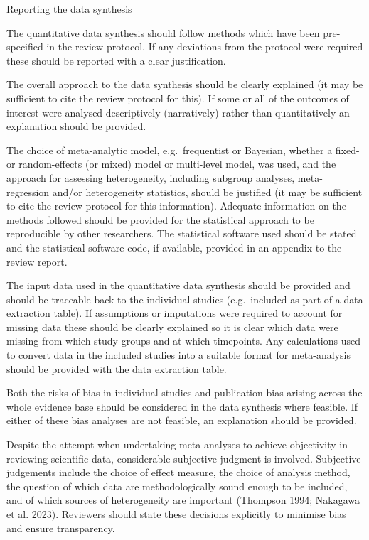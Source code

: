 \documentclass[
  letterpaper,
  DIV=11,
  numbers=noendperiod]{scrreprt}
\begin{document}
Reporting the data synthesis

The quantitative data synthesis should follow methods which have been
pre-specified in the review protocol. If any deviations from the
protocol were required these should be reported with a clear
justification.

The overall approach to the data synthesis should be clearly explained
(it may be sufficient to cite the review protocol for this). If some or
all of the outcomes of interest were analysed descriptively
(narratively) rather than quantitatively an explanation should be
provided.

The choice of meta-analytic model, e.g.~frequentist or Bayesian, whether
a fixed- or random-effects (or mixed) model or multi-level model, was
used, and the approach for assessing heterogeneity, including subgroup
analyses, meta-regression and/or heterogeneity statistics, should be
justified (it may be sufficient to cite the review protocol for this
information). Adequate information on the methods followed should be
provided for the statistical approach to be reproducible by other
researchers. The statistical software used should be stated and the
statistical software code, if available, provided in an appendix to the
review report.

The input data used in the quantitative data synthesis should be
provided and should be traceable back to the individual studies
(e.g.~included as part of a data extraction table). If assumptions or
imputations were required to account for missing data these should be
clearly explained so it is clear which data were missing from which
study groups and at which timepoints. Any calculations used to convert
data in the included studies into a suitable format for meta-analysis
should be provided with the data extraction table.

Both the risks of bias in individual studies and publication bias
arising across the whole evidence base should be considered in the data
synthesis where feasible. If either of these bias analyses are not
feasible, an explanation should be provided.

Despite the attempt when undertaking meta-analyses to achieve
objectivity in reviewing scientific data, considerable subjective
judgment is involved. Subjective judgements include the choice of effect
measure, the choice of analysis method, the question of which data are
methodologically sound enough to be included, and of which sources of
heterogeneity are important (Thompson 1994; {Nakagawa et al.} 2023).
Reviewers should state these decisions explicitly to minimise bias and
ensure transparency.
\end{document}
